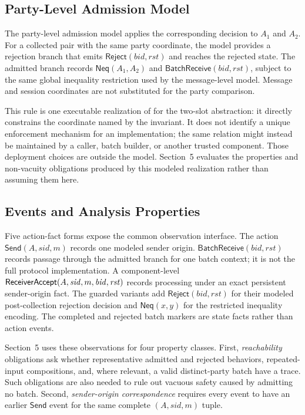 \subsection{Party-Level Admission Model}

The party-level admission model applies the corresponding decision to
$A_1$ and $A_2$. For a collected pair with the same party coordinate, the
model provides a rejection branch that emits
\(\mathsf{Reject}(\mathit{bid},\mathit{rst})\) and reaches the rejected state.
The admitted branch records \(\mathsf{Neq}(A_1,A_2)\) and
\(\mathsf{BatchReceive}(\mathit{bid},\mathit{rst})\), subject to the same
global inequality restriction used by the message-level model. Message and
session coordinates are not substituted for the party comparison.

This rule is one executable realization of \distinctparty for the two-slot
abstraction: it directly constrains the coordinate named by the invariant.
It does not identify a unique enforcement mechanism for an implementation;
the same relation might instead be maintained by a caller, batch builder, or
another trusted component. Those deployment choices are outside the model.
Section~5 evaluates the properties and non-vacuity obligations produced by
this modeled realization rather than assuming them here.

\subsection{Events and Analysis Properties}

Five action-fact forms expose the common observation interface. The action
\(\mathsf{Send}(A,\mathit{sid},m)\) records one modeled sender origin.
\(\mathsf{BatchReceive}(\mathit{bid},\mathit{rst})\) records passage through
the admitted branch for one batch context; it is not the full protocol
implementation. A component-level
\(\textsf{ReceiverAccept}(A,\mathit{sid},m,\mathit{bid},\mathit{rst})\) records
processing under an exact persistent sender-origin fact. The guarded variants
add \(\mathsf{Reject}(\mathit{bid},\mathit{rst})\) for their modeled
post-collection rejection decision and \(\mathsf{Neq}(x,y)\) for the
restricted inequality encoding. The completed and rejected batch markers are
state facts rather than action events.

Section~5 uses these observations for four property classes. First,
\emph{reachability} obligations ask whether representative admitted and
rejected behaviors, repeated-input compositions, and, where relevant, a valid
distinct-party batch have a trace. Such obligations are also needed to rule out
vacuous safety caused by admitting no batch. Second,
\emph{sender-origin correspondence} requires every \receiveraccept event to
have an earlier \(\mathsf{Send}\) event for the same complete
\((A,\mathit{sid},m)\) tuple.

